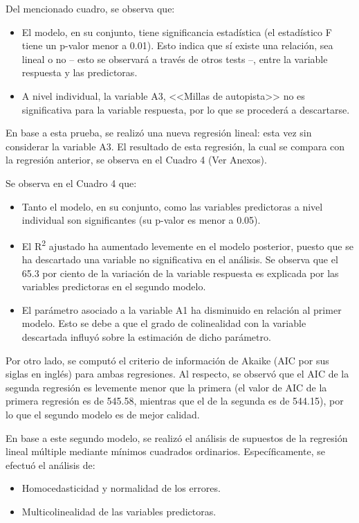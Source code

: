 \documentclass[a4paper,10pt]{article}\usepackage[]{graphicx}\usepackage[]{color}
\begin{document}
Del mencionado cuadro, se observa que:
\begin{itemize}
  \item El modelo, en su conjunto, tiene significancia estadística (el estadístico F tiene un p-valor menor a 0.01). Esto indica que sí existe una relación, sea lineal o no -- esto se observará a través de otros tests --, entre la variable respuesta y las predictoras.
  \item A nivel individual, la variable A3, <<Millas de autopista>> no es significativa para la variable respuesta, por lo que se procederá a descartarse.
\end{itemize}

En base a esta prueba, se realizó una nueva regresión lineal: esta vez sin considerar la variable A3. El resultado de esta regresión, la cual se compara con la regresión anterior, se observa en el Cuadro 4 (Ver Anexos).

Se observa en el Cuadro 4 que:
\begin{itemize}
  \item Tanto el modelo, en su conjunto, como las variables predictoras a nivel individual son significantes (su p-valor es menor a 0.05).
  \item El R\textsuperscript{2} ajustado ha aumentado levemente en el modelo posterior, puesto que se ha descartado una variable no significativa en el análisis. Se observa que el 65.3 por ciento de la variación de la variable respuesta es explicada por las variables predictoras en el segundo modelo.
  \item El parámetro asociado a la variable A1 ha disminuido en relación al primer modelo. Esto se debe a que el grado de colinealidad con la variable descartada influyó sobre la estimación de dicho parámetro.

\end{itemize}

  Por otro lado, se computó el criterio de información de Akaike (AIC por sus siglas en inglés) para ambas regresiones. Al respecto, se observó que el AIC de la segunda regresión es levemente menor que la primera (el valor de AIC de la primera regresión es de 545.58, mientras que el de la segunda es de 544.15), por lo que el segundo modelo es de mejor calidad.
  
En base a este segundo modelo, se realizó el análisis de supuestos de la regresión lineal múltiple mediante mínimos cuadrados ordinarios. Específicamente, se efectuó el análisis de:

\begin{itemize}
  \item Homocedasticidad y normalidad de los errores.
  \item Multicolinealidad de las variables predictoras.
\end{itemize}
\end{document}
